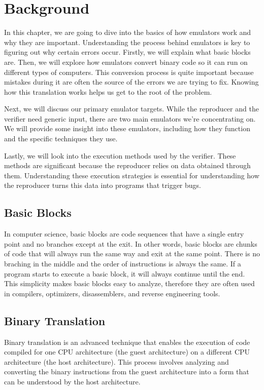 
\chapter{Background}\label{chapter:background}
In this chapter, we are going to dive into the basics of how emulators work and why they are important.
Understanding the process behind emulators is key to figuring out why certain errors occur.
Firstly, we will explain what basic blocks are.
Then, we will explore how emulators convert binary code so it can run on different types of computers.
This conversion process is quite important because mistakes during it are often the source of the errors we are trying to fix.
Knowing how this translation works helps us get to the root of the problem.

Next, we will discuss our primary emulator targets.
While the reproducer and the verifier need generic input, there are two main emulators we're concentrating on.
We will provide some insight into these emulators, including how they function and the specific techniques they use.

Lastly, we will look into the execution methods used by the verifier.
These methods are significant because the reproducer relies on data obtained through them.
Understanding these execution strategies is essential for understanding how the reproducer turns this data into programs that trigger bugs.

\section{Basic Blocks}
In computer science, basic blocks are code sequences that have a single entry point and no branches except at the exit.
In other words, basic blocks are chunks of code that will always run the same way and exit at the same point.
There is no braching in the middle and the order of instructions is always the same.
If a program starts to execute a basic block, it will always continue until the end.
This simplicity makes basic blocks easy to analyze, therefore they are often used in compilers, optimizers, disassemblers, and reverse engineering tools.

\section{Binary Translation}
Binary translation is an advanced technique that enables the execution of code compiled for one CPU architecture (the guest architecture) on a different CPU architecture (the host architecture).
This process involves analyzing and converting the binary instructions from the guest architecture into a form that can be understood by the host architecture. 

